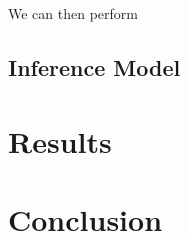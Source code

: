 \documentclass[a4paper, 12pt]{article}
\theoremstyle{definition}
\begin{document}
We can then perform

\subsection{Inference Model}

\section{Results}

\section{Conclusion}

\bigskip


\end{document}
